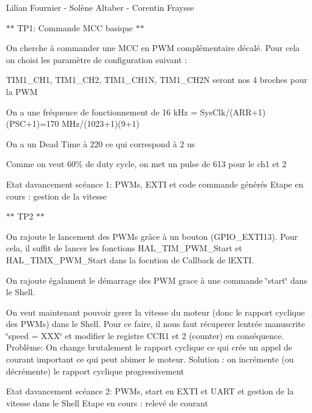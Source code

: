 Lilian Fournier -\/ Solène Altaber -\/ Corentin Fraysse

$\ast$$\ast$ TP1\+: Commande MCC basique $\ast$$\ast$ ~\newline


On cherche à commander une MCC en PWM complémentaire décalé. Pour cela on choisi les paramètre de configuration suivant \+:
\begin{DoxyItemize}
\item TIM1\+\_\+\+CH1, TIM1\+\_\+\+CH2, TIM1\+\_\+\+CH1N, TIM1\+\_\+\+CH2N seront nos 4 broches pour la PWM
\item On a une fréquence de fonctionnement de 16 k\+Hz = Sys\+Clk/(ARR+1)(PSC+1)=170 MHz/(1023+1)(9+1)
\item On a un Dead Time à 220 ce qui correspond à 2 us
\item Comme on veut 60\% de duty cycle, on met un pulse de 613 pour le ch1 et 2
\end{DoxyItemize}

Etat d\textquotesingle{}avancement scéance 1\+: PWMs, EXTI et code commande générés Etape en cours \+: gestion de la vitesse

$\ast$$\ast$ TP2 $\ast$$\ast$


\begin{DoxyItemize}
\item On rajoute le lancement des PWMs grâce à un bouton (GPIO\+\_\+\+EXTI13). Pour cela, il suffit de lancer les fonctions HAL\+\_\+\+TIM\+\_\+\+PWM\+\_\+\+Start et HAL\+\_\+\+TIMX\+\_\+\+PWM\+\_\+\+Start dans la focntion de Callback de l\textquotesingle{}EXTI.
\item On rajoute égalament le démarrage des PWM grace à une commande \char`\"{}start\char`\"{} dans le Shell.
\item On veut maintenant pouvoir gerer la vitesse du moteur (donc le rapport cyclique des PWMs) dans le Shell. Pour ce faire, il nous faut récuperer l\textquotesingle{}entrée manuscrite \char`\"{}speed = XXX\char`\"{} et modifier le registre CCR1 et 2 (counter) en conséquence. Problème\+: On change brutalement le rapport cyclique ce qui crée un appel de courant important ce qui peut abimer le moteur. Solution \+: on incrémente (ou décrémente) le rapport cyclique progressivement
\end{DoxyItemize}

Etat d\textquotesingle{}avancement scéance 2\+: PWMs, start en EXTI et UART et gestion de la vitesse dans le Shell Etape en cours \+: relevé de courant 